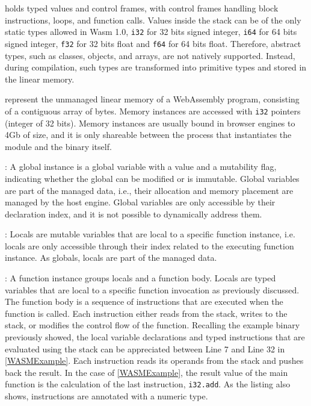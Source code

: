  holds typed values and control frames, with control frames handling block instructions, loops, and function calls.
Values inside the stack can be of the only static types allowed in Wasm 1.0, \texttt{i32} for 32 bits signed integer, \texttt{i64} for 64 bits signed integer, \texttt{f32} for 32 bits float and \texttt{f64} for 64 bits float.
Therefore, abstract types, such as classes, objects, and arrays, are not natively supported. 
Instead, during compilation, such types are transformed into primitive types and stored in the linear memory.

 represent the unmanaged linear memory of a WebAssembly program, consisting of a contiguous array of bytes.
Memory instances are accessed with \texttt{i32} pointers (integer of 32 bits). 
Memory instances are usually bound in browser engines to 4Gb of size, and it is only shareable between the process that instantiates the \Wasm module and the binary itself.

: A global instance is a global variable with a value and a mutability flag, indicating whether the global can be modified or is immutable.
Global variables are part of the managed data, i.e., their allocation and memory placement are managed by the host engine.
Global variables are only accessible by their declaration index, and it is not possible to dynamically address them. 


: Locals are mutable variables that are local to a specific function instance, i.e. locals are only accessible through their index related to the executing function instance. As globals, locals are part of the managed data.

: 
A function instance groups locals and a function body.
Locals are typed variables that are local to a specific function invocation as previously discussed.
The function body is a sequence of instructions that are executed when the function is called.
Each instruction either reads from the stack, writes to the stack, or modifies the control flow of the function.
Recalling the example \wasm binary previously showed, 
the local variable declarations and typed instructions that are evaluated using the stack can be appreciated between Line 7 and Line 32 in \autoref{WASMExample}. 
Each instruction reads its operands from the stack and pushes back the result. 
In the case of \autoref{WASMExample}, the result value of the main function is the calculation of the last instruction, \texttt{i32.add}. 
As the listing also shows, instructions are annotated with a numeric type.


